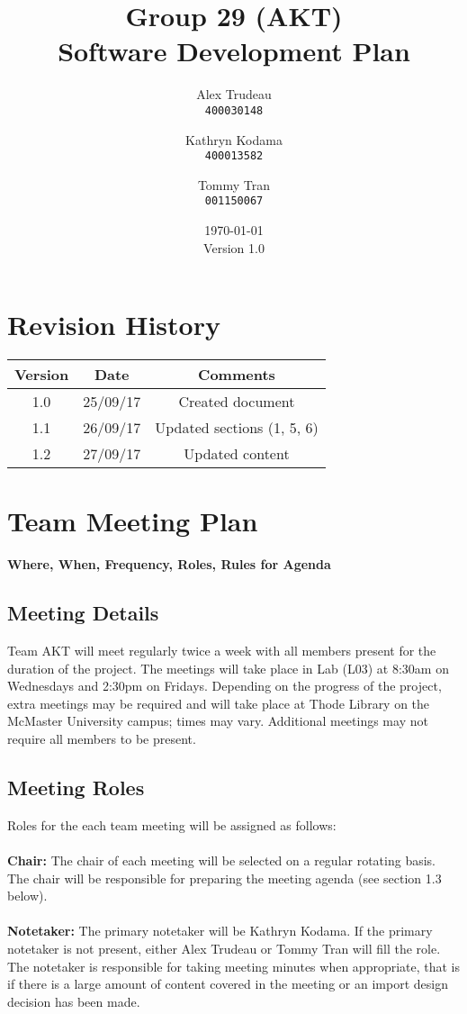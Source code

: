 \documentclass[12pt,fleqn]{article}
\title{Group 29 (AKT)\\ Software Development Plan}
\author{
Alex Trudeau\\
	\texttt{400030148}
\and
Kathryn Kodama\\
  	\texttt{400013582}
\and
Tommy Tran\\
	\texttt{001150067}
}
\date{\today\\Version 1.0}
\begin{document}
\maketitle



\pagebreak
\tableofcontents

\section* {Revision History}

\begin{tabular}{ |c| c| c| }
\hline
Version & Date & Comments \\
\hline
1.0 & 25/09/17 & Created document \\
\hline
1.1 & 26/09/17 & Updated sections (1, 5, 6) \\
\hline
1.2 & 27/09/17 & Updated content \\
\hline
\end{tabular}


\pagebreak

\section{Team Meeting Plan}
\textbf{Where, When, Frequency, Roles, Rules for Agenda}

\subsection{Meeting Details}

Team AKT will meet regularly twice a week with all members present for the duration of the project.  The meetings will take place in Lab (L03) at 8:30am on Wednesdays and 2:30pm on Fridays.  Depending on the progress of the project, extra meetings may be required and will take place at Thode Library on the McMaster University campus; times may vary.  Additional meetings may not require all members to be present.


\subsection{Meeting Roles}
Roles for the each team meeting will be assigned as follows:\\ \\
\textbf{Chair:} The chair of each meeting will be selected on a regular rotating basis.  The chair will be responsible for preparing the meeting agenda (see section 1.3 below).\\ \\
\textbf{Notetaker:} The primary notetaker will be Kathryn Kodama.  If the primary notetaker is not present, either Alex Trudeau or Tommy Tran will fill the role.  The notetaker is responsible for taking meeting minutes when appropriate, that is if there is a large amount of content covered in the meeting or an import design decision has been made.  
\end{document}

